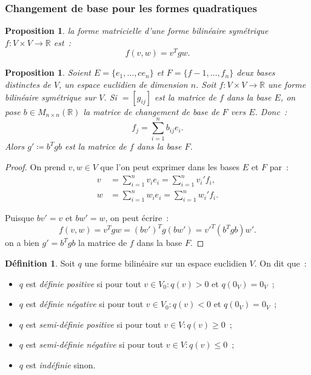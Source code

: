 \documentclass{article}
\newcommand{\R}{\mathbb R}
\newcommand{\M}[3]{M_{#1 \times #2}(#3)}
\newtheorem{prp}[thm]{Proposition}
\theoremstyle{definition}
\newtheorem{déf}[thm]{Définition}
\theoremstyle{remark}
\begin{document}
		\subsubsection{Changement de base pour les formes quadratiques}
		\begin{prp} la forme matricielle d'une forme bilinéaire symétrique $f : V \times V \to \R$ est~:
		\[f(v, w) = v^Tgw.\]
		\end{prp}

		\begin{prp} Soient $E = \{e_1, \dots,c e_n\}$ et $F = \{f-1, \dotsc, f_n\}$ deux bases distinctes de $V$, un espace euclidien de dimension $n$. Soit
		$f : V \times V \to \R$ une forme bilinéaire symétrique sur $V$. Si $ = [g_{ij}]$ est la matrice de $f$ dans la base $E$, on pose $b \in \M nn\R$ la
		matrice de changement de base de $F$ vers $E$. Donc~:
		\[f_j = \sum_{i=1}^nb_{ij}e_i.\]
		Alors $g' \coloneqq b^Tgb$ est la matrice de $f$ dans la base $F$.
		\end{prp}

		\begin{proof}
		On prend $v, w \in V$ que l'on peut exprimer dans les bases $E$ et $F$ par~:
		\begin{align*}
			v &= \sum_{i=1}^nv_ie_i = \sum_{i=1}^nv_i'f_i, \\
			w &= \sum_{i=1}^nw_ie_i = \sum_{i=1}^nw_i'f_i.
		\end{align*}

		Puisque $bv' = v$ et $bw' = w$, on peut écrire~:
		\[f(v, w) = v^Tgw = (bv')^Tg(bw') = v'^T(b^Tgb)w'.\]
		on a bien $g' = b^Tgb$ la matrice de $f$ dans la base $F$.
		\end{proof}

		\begin{déf} Soit $q$ une forme bilinéaire sur un espace euclidien $V$. On dit que~:
		\begin{itemize}
			\item $q$ est \emph{définie positive} si pour tout $v \in V_0 : q(v) > 0$ et $q(0_V) = 0_V$~;
			\item $q$ est \emph{définie négative} si pour tout $v \in V_0 : q(v) < 0$ et $q(0_V) = 0_V$~;
			\item $q$ est \emph{semi-définie positive} si pour tout $v \in V : q(v) \geq 0$~;
			\item $q$ est \emph{semi-définie négative} si pour tout $v \in V : q(v) \leq 0$~;
			\item $q$ est \emph{indéfinie} sinon.
		\end{itemize}
		\end{déf}
\end{document}

